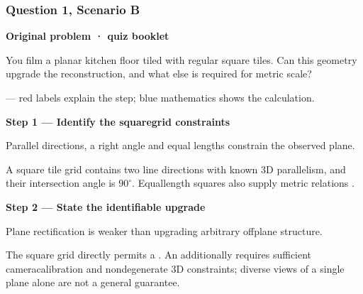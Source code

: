 \documentclass[letterpaper,11pt,english,openany,oneside]{jupyterBook}
\begin{document}
\par


\subsubsection{Question 1, Scenario B}
\label{\detokenize{lectures/lecture06/quiz-workbook:question-1-scenario-b}}\label{\detokenize{lectures/lecture06/quiz-workbook:quiz-12-q2}}
\par\medskip\textbf{Original problem · quiz booklet}\par\smallskip

\sphinxAtStartPar
You film a planar kitchen floor tiled with regular square tiles. Can this geometry upgrade the reconstruction, and what else is required for metric scale?

\par\medskip

\sphinxAtStartPar
{} — red labels explain the step; blue mathematics shows the calculation.

\par\medskip{}
{\color{QuizStepRed}\bfseries Step 1 — Identify the square\sphinxhyphen{}grid constraints}\par\smallskip

\sphinxAtStartPar
{} Parallel directions, a right angle and equal lengths constrain the observed plane.

\sphinxAtStartPar
A square tile grid contains two line directions with known 3D parallelism, and their intersection angle is {\color{QuizMathBlue} \(90^\circ\)}. Equal\sphinxhyphen{}length squares also supply metric relations .

\par

\par\medskip{}
{\color{QuizStepRed}\bfseries Step 2 — State the identifiable upgrade}\par\smallskip

\sphinxAtStartPar
{} Plane rectification is weaker than upgrading arbitrary off\sphinxhyphen{}plane structure.

\sphinxAtStartPar
The square grid directly permits a . An   additionally requires sufficient camera\sphinxhyphen{}calibration and nondegenerate 3D constraints; diverse views of a single plane alone are not a general guarantee.
\end{document}
